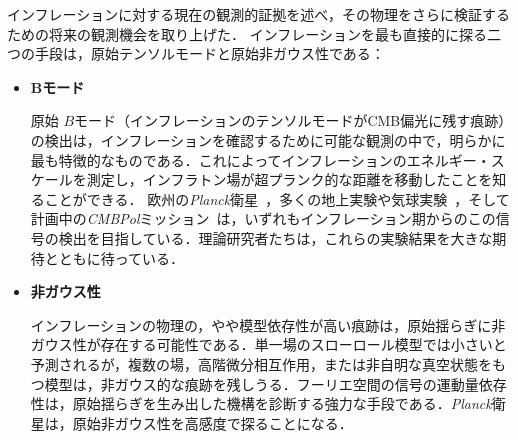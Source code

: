 \label{sec:conclusion}

インフレーションに対する現在の観測的証拠を述べ，その物理をさらに検証するための将来の観測機会を取り上げた．
インフレーションを最も直接的に探る二つの手段は，原始テンソルモードと原始非ガウス性である：
\begin{itemize}
\item {\bf Bモード}

原始 $B$モード（インフレーションのテンソルモードがCMB偏光に残す痕跡）の検出は，インフレーションを確認するために可能な観測の中で，明らかに最も特徴的なものである．これによってインフレーションのエネルギー・スケールを測定し，インフラトン場が超プランク的な距離を移動したことを知ることができる．
欧州の{\sl Planck}衛星~\cite{:2006uk}，多くの地上実験や気球実験~\cite{CMBPolWorkshop, Kosowsky:2004sw, Ruhl:2004kv, Taylor:2006jw, Samtleben:2008rb, Yoon:2006jc, Oxley:2005dg, MacTavish:2007kh}，そして計画中の{\sl CMBPol}ミッション~\cite{WhitePaper, Bock:2009xw}は，いずれもインフレーション期からのこの信号の検出を目指している．理論研究者たちは，これらの実験結果を大きな期待とともに待っている．

\item {\bf 非ガウス性}

インフレーションの物理の，やや模型依存性が高い痕跡は，原始揺らぎに非ガウス性が存在する可能性である．単一場のスローロール模型では小さいと予測されるが，複数の場，高階微分相互作用，または非自明な真空状態をもつ模型は，非ガウス的な痕跡を残しうる．フーリエ空間の信号の運動量依存性は，原始揺らぎを生み出した機構を診断する強力な手段である．{\sl Planck}衛星は，原始非ガウス性を高感度で探ることになる．
\end{itemize}

